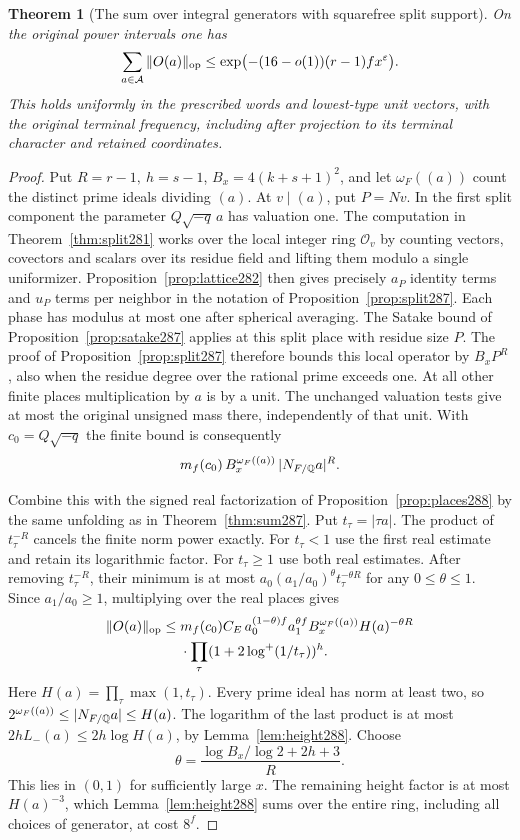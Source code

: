 \documentclass[a4paper,11pt]{article}
\newtheorem{theorem}[proposition]{Theorem}
\theoremstyle{definition}
\theoremstyle{remark}
\numberwithin{equation}{section}
\begin{document}
\begin{theorem}[The sum over integral generators with squarefree split support]\leavevmode
\label{thm:field288}
On the original power intervals one has
\[
   \sum_{a\in\mathcal A}\|O(a)\|_{\rm op}
       \le \exp\bigl(-(16-o(1))(r-1)f x^\varepsilon\bigr).
\]
This holds uniformly in the prescribed words and lowest-type
unit vectors, with the original terminal frequency, including
after projection to its terminal character and retained
coordinates.
\end{theorem}
\begin{proof}
Put \(R=r-1,\ h=s-1\), \(B_x=4(k+s+1)^2\), and
let \(\omega_F((a))\) count the distinct prime ideals dividing
\((a)\). At \(v\mid(a)\), put \(P=Nv\). In the first split
component the parameter \(Q\sqrt{-q}\,a\) has valuation one.
The computation in Theorem~\ref{thm:split281} works over the
local integer ring \(\mathcal O_v\) by counting vectors,
covectors and scalars over its residue field and lifting them
modulo a single uniformizer. Proposition~\ref{prop:lattice282}
then gives precisely \(a_P\) identity terms and \(u_P\)
terms per neighbor in the notation of
Proposition~\ref{prop:split287}. Each phase has modulus at
most one after spherical averaging. The Satake bound of
Proposition~\ref{prop:satake287} applies at this split place
with residue size \(P\). The proof of
Proposition~\ref{prop:split287} therefore bounds this local
operator by \(B_xP^R\), also when the residue degree over
the rational prime exceeds one. At all other finite places
multiplication by \(a\) is by a unit. The unchanged
valuation tests give at most the original unsigned mass
there, independently of that unit. With \(c_0=Q\sqrt{-q}\)
the finite bound is consequently
\[
 m_f(c_0)\, B_x^{\omega_F((a))}\,|N_{F/\mathbb Q}a|^R .
\]

Combine this with the signed real factorization of
Proposition~\ref{prop:places288} by the same unfolding as in
Theorem~\ref{thm:sum287}. Put \(t_\tau=|\tau a|\).
The product of \(t_\tau^{-R}\) cancels the finite norm
power exactly. For \(t_\tau<1\) use the first real estimate
and retain its logarithmic factor. For \(t_\tau\ge1\)
use both real estimates. After removing \(t_\tau^{-R}\),
their minimum is at most
\(a_0(a_1/a_0)^\theta t_\tau^{-\theta R}\)
for any \(0\le\theta\le1\). Since \(a_1/a_0\ge1\),
multiplying over the real places gives
\[
 \begin{split}
 \|O(a)\|_{\rm op}\le {}&
   m_f(c_0)C_E\,a_0^{(1-\theta)f}a_1^{\theta f}
   B_x^{\omega_F((a))} H(a)^{-\theta R}\\
   &{}\cdot\prod_\tau(1+2\log^+(1/t_\tau))^h .
 \end{split}
\]
Here \(H(a)=\prod_\tau\max(1,t_\tau)\).
Every prime ideal has norm at least two, so
\(2^{\omega_F((a))}\le |N_{F/\mathbb Q}a|\le H(a)\).
The logarithm of the last product is at most
\(2hL_-(a)\le2h\log H(a)\), by Lemma~\ref{lem:height288}.
Choose
\[
      \theta=\frac{\log B_x/\log2+2h+3}{R}.
\]
This lies in \((0,1)\) for sufficiently large \(x\).
The remaining height factor is at most \(H(a)^{-3}\), which
Lemma~\ref{lem:height288} sums over the entire ring,
including all choices of generator, at cost \(8^f\).


\end{proof}
\end{document}
